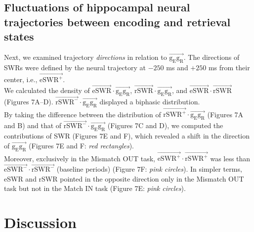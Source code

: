 \documentclass[final,3p,times,twocolumn]{elsarticle}
\begin{document}
\subsection{Fluctuations of hippocampal neural trajectories between encoding and retrieval states}
Next, we examined trajectory \textit{directions} in relation to $\overrightarrow{\mathrm{g_{E}g_{R}}}$. The directions of SWRs were defined by the neural trajectory at $-250$ ms and $+250$ ms from their center, i.e., $\overrightarrow{\mathrm{eSWR^+}}$.
\\
\indent
We calculated the density of $\overrightarrow{\mathrm{eSWR}} \cdot \overrightarrow{\mathrm{g_{E}g_{R}}}$, $\overrightarrow{\mathrm{rSWR}} \cdot \overrightarrow{\mathrm{g_{E}g_{R}}}$, and $\overrightarrow{\mathrm{eSWR}} \cdot \overrightarrow{\mathrm{rSWR}}$ (Figures 7A--D). $\overrightarrow{\mathrm{rSWR^-}} \cdot \overrightarrow{\mathrm{g_{E}g_{R}}}$ displayed a biphasic distribution.
\\
\indent
By taking the difference between the distribution of $\overrightarrow{\mathrm{rSWR^+}} \cdot \overrightarrow{\mathrm{g_{E}g_{R}}}$ (Figures 7A and B) and that of $\overrightarrow{\mathrm{rSWR^-}} \cdot \overrightarrow{\mathrm{g_{E}g_{R}}}$ (Figures 7C and D), we computed the contributions of SWR (Figures 7E and F), which revealed a shift in the direction of $\overrightarrow{\mathrm{g_{E}g_{R}}}$ (Figures 7E and F: \textit{red rectangles}).
\\
\indent
Moreover, exclusively in the Mismatch OUT task, $\overrightarrow{\mathrm{eSWR^+}} \cdot \overrightarrow{\mathrm{rSWR^+}}$ was less than $\overrightarrow{\mathrm{eSWR^-}} \cdot \overrightarrow{\mathrm{rSWR^-}}$ (baseline periods) (Figure 7F: \textit{pink circles}). In simpler terms, eSWR and rSWR pointed in the opposite direction only in the Mismatch OUT task but not in the Match IN task (Figure 7E: \textit{pink circles}).
\label{sec:results}\section{Discussion}
\end{document}
